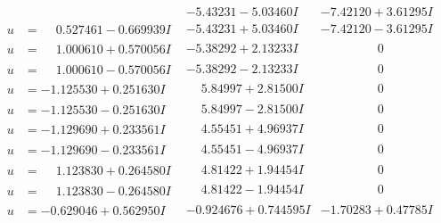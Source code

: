\documentclass[1p]{elsarticle_modified}
\theoremstyle{definition}
\begin{document}
$$\begin{array}{c|c|c}
 & -5.43231 - 5.03460 I & -7.42120 + 3.61295 I \\ \hline\begin{aligned}
u &= \phantom{-}0.527461 - 0.669939 I\end{aligned}
 & -5.43231 + 5.03460 I & -7.42120 - 3.61295 I \\ \hline\begin{aligned}
u &= \phantom{-}1.000610 + 0.570056 I\end{aligned}
 & -5.38292 + 2.13233 I & \phantom{-0.000000 } 0 \\ \hline\begin{aligned}
u &= \phantom{-}1.000610 - 0.570056 I\end{aligned}
 & -5.38292 - 2.13233 I & \phantom{-0.000000 } 0 \\ \hline\begin{aligned}
u &= -1.125530 + 0.251630 I\end{aligned}
 & \phantom{-}5.84997 + 2.81500 I & \phantom{-0.000000 } 0 \\ \hline\begin{aligned}
u &= -1.125530 - 0.251630 I\end{aligned}
 & \phantom{-}5.84997 - 2.81500 I & \phantom{-0.000000 } 0 \\ \hline\begin{aligned}
u &= -1.129690 + 0.233561 I\end{aligned}
 & \phantom{-}4.55451 + 4.96937 I & \phantom{-0.000000 } 0 \\ \hline\begin{aligned}
u &= -1.129690 - 0.233561 I\end{aligned}
 & \phantom{-}4.55451 - 4.96937 I & \phantom{-0.000000 } 0 \\ \hline\begin{aligned}
u &= \phantom{-}1.123830 + 0.264580 I\end{aligned}
 & \phantom{-}4.81422 + 1.94454 I & \phantom{-0.000000 } 0 \\ \hline\begin{aligned}
u &= \phantom{-}1.123830 - 0.264580 I\end{aligned}
 & \phantom{-}4.81422 - 1.94454 I & \phantom{-0.000000 } 0 \\ \hline\begin{aligned}
u &= -0.629046 + 0.562950 I\end{aligned}
 & -0.924676 + 0.744595 I & -1.70283 + 0.47785 I \\ \hline\begin{aligned}

\end{aligned}
\end{array}$$
\end{document}
